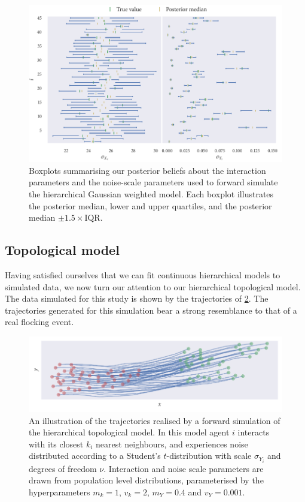 \begin{figure}[tbp]
  \includegraphics{gauss_hier_summary.pdf}
  \caption{Boxplots summarising our posterior beliefs about the interaction
    parameters and the noise-scale parameters used to forward simulate the
    hierarchical Gaussian weighted model. Each boxplot illustrates the
    posterior median, lower and upper quartiles, and the posterior median
    $\pm1.5\times\text{IQR}$.}
  \label{fig:gauss_hier_summary}
\end{figure}

\subsection{Topological model}

Having satisfied ourselves that we can fit continuous hierarchical models to
simulated data, we now turn our attention to our hierarchical topological
model. The data simulated for this study is shown by the trajectories of
\cref{fig:top_hier_sim}. The trajectories generated for this simulation bear a
strong resemblance to that of a real flocking event.

\begin{figure}[tbp]
  \includegraphics{top_hier_sim.pdf}
  \caption{An illustration of the trajectories realised by a forward
    simulation of the hierarchical topological model. In this model agent $i$
    interacts with its closest $k_i$ nearest neighbours, and experiences noise
    distributed according to a Student's $t$-distribution with scale
    $\sigma_{Y_i}$ and degrees of freedom $\nu$. Interaction and noise scale
    parameters are drawn from population level distributions, parameterised by the
    hyperparameters $m_k=1$, $v_k=2$, $m_Y=0.4$ and $v_Y=0.001$.}
  \label{fig:top_hier_sim}
\end{figure}

